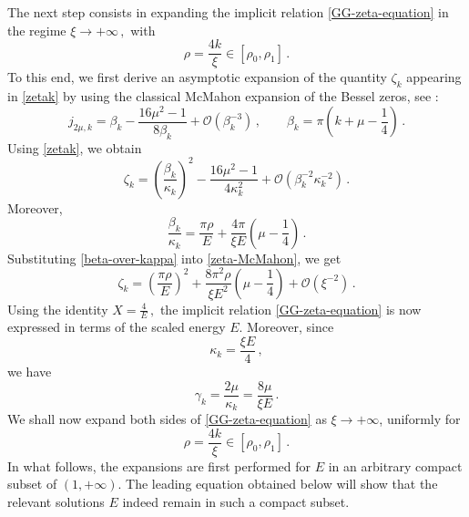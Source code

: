 \documentclass[11pt]{amsart}
\numberwithin{equation}{section}
\theoremstyle{remark}
\newcommand{\mn}{\medskip\noindent}
\begin{document}
\mn
The next step consists in expanding the implicit relation
\eqref{GG-zeta-equation} in the regime
$
\xi\to+\infty\,,
$
with
\[
\rho=\frac{4k}{\xi}\in[\rho_0,\rho_1]\,.
\]
To this end, we first derive an asymptotic expansion of the quantity
\(\zeta_k\) appearing in \eqref{zetak} by using the classical
McMahon expansion of the Bessel zeros, see \cite[\S10.21, Eq.~(10.21.19)]{DLMF}:
\begin{equation}
j_{2\mu,k}
=
\beta_k
-
\frac{16\mu^2-1}{8\beta_k}
+
\mathcal O(\beta_k^{-3})\,,
\qquad
\beta_k=\pi\left(k+\mu-\frac14\right)\,.
\end{equation}
Using \eqref{zetak}, we obtain
\begin{equation}\label{zeta-McMahon}
\zeta_k
=
\left(
\frac{\beta_k}{\kappa_k}
\right)^2
-
\frac{16\mu^2-1}{4\kappa_k^2}
+
\mathcal O(\beta_k^{-2}\kappa_k^{-2})\,.
\end{equation}
Moreover,
\begin{equation}\label{beta-over-kappa}
\frac{\beta_k}{\kappa_k}
=
\frac{\pi\rho}{E}
+
\frac{4\pi}{\xi E}
\left(\mu-\frac14\right)\,.
\end{equation}
Substituting \eqref{beta-over-kappa} into
\eqref{zeta-McMahon}, we get
\begin{equation}\label{zeta-expansion-E}
\zeta_k
=
\left(
\frac{\pi\rho}{E}
\right)^2
+
\frac{8\pi^2\rho}{\xi E^2}
\left(\mu-\frac14\right)
+
\mathcal O(\xi^{-2})\,.
\end{equation}
Using the identity
$
X=\frac4E\,,
$
the implicit relation \eqref{GG-zeta-equation} is now expressed in terms
of the scaled energy \(E\). Moreover, since
\[
\kappa_k=\frac{\xi E}{4}\,,
\]
we have
\begin{equation}\label{gamma-energy}
\gamma_k
=
\frac{2\mu}{\kappa_k}
=
\frac{8\mu}{\xi E}\,.
\end{equation}
We shall now expand both sides of \eqref{GG-zeta-equation} as
\(\xi\to+\infty\), uniformly for 
\[
\rho=\frac{4k}{\xi}\in[\rho_0,\rho_1]\,.
\]
In what follows, the expansions are first performed for \(E\) in an
arbitrary compact subset of \((1,+\infty)\). The leading equation obtained
below will show that the relevant solutions \(E\) indeed remain in such a compact subset.
\end{document}
